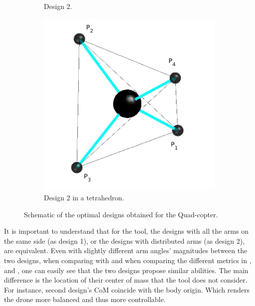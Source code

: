 \begin{figure}[!h]
{\begin{subfigure}[b]{0.4\textwidth}
    \caption{Design 2.} \label{fig:Quadcopter_2}
  \end{subfigure}
  \hspace*{\fill} %
  \begin{subfigure}[b]{0.35\textwidth}
    \includegraphics[width=\linewidth]{images/Quad_tetrahedron.jpg}
    \caption{Design 2 in a tetrahedron.} \label{fig:Quadcopter_2_tetra}
  \end{subfigure}}
  \caption{Schematic of the optimal designs obtained for the Quad-copter.}
  \label{fig:Quadcopter_result}
\end{figure}
It is important to understand that for the tool, the designs with all the arms
on the same side (as design 1), or the designs with distributed arms (as design 2),
are equivalent. Even with slightly different arm angles’ magnitudes
between the two designs, when comparing with
 and when comparing the different metrics
in ,  and
, one can easily see that the two designs
propose similar abilities. The main difference is the location of their center of mass
that the tool does not consider. For instance, second design’s CoM coincide with
the body origin. Which renders the drone more balanced and thus more controllable.

